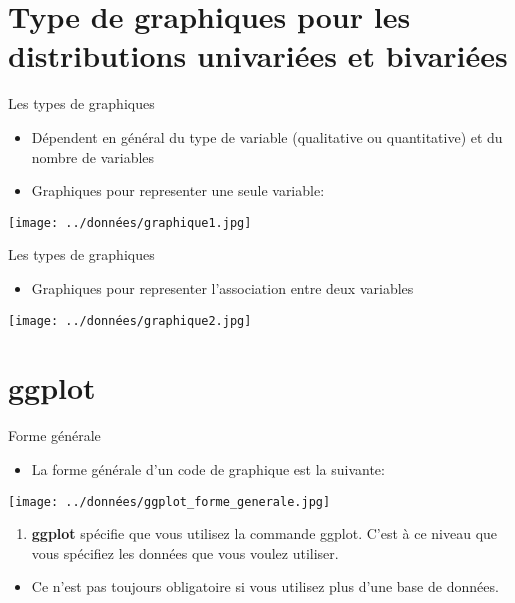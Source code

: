 \documentclass[
  ignorenonframetext,
]{beamer}
\providecommand{\tightlist}{%
  \setlength{\itemsep}{0pt}\setlength{\parskip}{0pt}}
\begin{document}
\hypertarget{type-de-graphiques-pour-les-distributions-univariuxe9es-et-bivariuxe9es}{%
\section{Type de graphiques pour les distributions univariées et
bivariées}\label{type-de-graphiques-pour-les-distributions-univariuxe9es-et-bivariuxe9es}}

\begin{frame}{Les types de graphiques}
\protect\hypertarget{les-types-de-graphiques}{}
\begin{itemize}
\item
  Dépendent en général du type de variable (qualitative ou quantitative)
  et du nombre de variables
\item
  Graphiques pour representer une seule variable:
\end{itemize}

\texttt{[image: ../données/graphique1.jpg]}
\end{frame}

\begin{frame}{Les types de graphiques}
\protect\hypertarget{les-types-de-graphiques-1}{}
\begin{itemize}
\tightlist
\item
  Graphiques pour representer l'association entre deux variables
\end{itemize}

\texttt{[image: ../données/graphique2.jpg]}
\end{frame}

\hypertarget{ggplot}{%
\section{ggplot}\label{ggplot}}

\begin{frame}{Forme générale}
\protect\hypertarget{forme-guxe9nuxe9rale}{}
\begin{itemize}
\tightlist
\item
  La forme générale d'un code de graphique est la suivante:
\end{itemize}

\texttt{[image: ../données/ggplot\_forme\_generale.jpg]}

\begin{enumerate}
\tightlist
\item
  \textbf{ggplot} spécifie que vous utilisez la commande ggplot. C'est à
  ce niveau que vous spécifiez les données que vous voulez utiliser.
\end{enumerate}

\begin{itemize}
\tightlist
\item
  Ce n'est pas toujours obligatoire si vous utilisez plus d'une base de
  données.
\end{itemize}
\end{frame}
\end{document}
